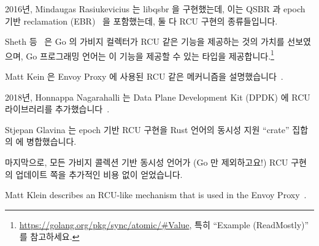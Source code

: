 2016년, Mindaugas Rasiukevicius 는 libqsbr 을 구현했는데, 이는 QSBR 과 epoch
기반 reclamation (EBR)~\cite{MindaugasRasiukevicius2016libqsbr} 을 포함했는데,
둘 다 RCU 구현의 종류들입니다.

Sheth 등~\cite{HarshalSheth2016goRCU} 은 Go 의 가비지 컬렉터가 RCU 같은 기능을
제공하는 것의 가치를 선보였으며, Go 프로그래밍 언어는 이 기능을 제공할 수 있는
 타입을 제공합니다.\footnote{
	\url{https://golang.org/pkg/sync/atomic/\#Value}, 특히 ``Example
	(ReadMostly)'' 를 참고하세요.}

\iffalse


NetBSD began using the aforementioned passive serialization with v6.0 in
2012~\cite{NetBSD2012pserialize}.
Among other things, passive serialization is used in
NetBSD packet filter (NPF)~\cite{MindaugasRasiukevicius2014NPFRCU}.

Paolo Bonzini added RCU support to the QEMU emulator in 2015 via a
friendly fork of the userspace RCU
library~\cite{MikeDay2013RCUqemu,PaoloBonzini2013QEMURCU}.

In 2015, Maxim Khizhinsky added RCU to
libcds~\cite{MaxKhiszinsky2015C++RCU}.

Mindaugas Rasiukevicius implemented libqsbr in 2016, which features
QSBR and epoch-based reclamation
(EBR)~\cite{MindaugasRasiukevicius2016libqsbr},
both of which are types of implementations of RCU\@.

Sheth et al.~\cite{HarshalSheth2016goRCU}
demonstrated the value of leveraging Go's garbage
collector to provide RCU-like functionality, and
the Go programming language provides a \co{Value} type that can
provide this functionality.\footnote{
	See \url{https://golang.org/pkg/sync/atomic/\#Value}, particularly
	the ``Example (ReadMostly)''.}

\fi

Matt Kein 은 Envoy Proxy 에 사용된 RCU 같은 메커니즘을
설명했습니다~\cite{MattKlein2017EnvoyRCU}.

2018년, Honnappa Nagarahalli 는 Data Plane Development Kit (DPDK) 에 RCU
라이브러리를 추가했습니다~\cite{HonnappaNagarahalli2018dpdkRCU}.

Stjepan Glavina 는 epoch 기반 RCU 구현을 Rust 언어의 동시성 지원 ``crate''
집합의  에 병합했습니다.

마지막으로, 모든 가비지 콜렉션 기반 동시성 언어가 (Go 만 제외하고요!) RCU
구현의 업데이트 쪽을 추가적인 비용 없이 얻었습니다.

\iffalse

Matt Klein describes an RCU-like mechanism that is used in the Envoy
Proxy~\cite{MattKlein2017EnvoyRCU}.


